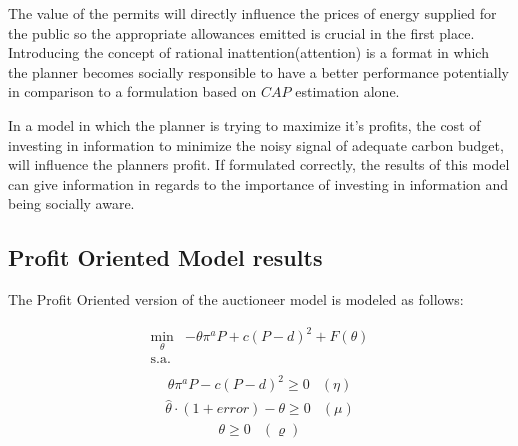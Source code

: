\documentclass[a4paper,fleqn]{cas-dc}
\begin{document}
%

The value of the permits will directly influence the prices of energy supplied for the public so the appropriate allowances emitted is crucial in the first place. Introducing the concept of rational inattention(attention) is a format in which the planner becomes socially responsible to have a better performance potentially in comparison to a formulation based on $CAP$ estimation alone.

In a model in which the planner is trying to maximize it's profits, the cost of investing in information to minimize the noisy signal of adequate carbon budget, will influence the planners profit. If formulated correctly, the results of this model can give information in regards to the importance of investing in information and being socially aware.



\subsection{Profit Oriented Model results}\label{subsec:resultsPO}
\vspace{2.5mm}
The Profit Oriented version of the auctioneer model is modeled as follows:


\begin{equation}
\begin{array}{rrclcl}
   \displaystyle \min_{\theta} & -\theta \pi^aP + c(P-d)^2+F(\theta) \\\textrm{s.a.} \label{eq:profit2}\\
\end{array}
\end{equation}
\begin{equation}
\begin{array}{cl}
    \theta \pi^a P - c(P-d)^2 \geq 0 & (\eta)  \label{profit2:r1}
\end{array}
\end{equation}
\begin{equation}
\begin{array}{cl}
    \hat{\theta}\cdot(1+error)-\theta \geq 0 & (\mu)  \label{profit2:r2}
\end{array}
\end{equation}
\begin{equation}
\begin{array}{cl}
    \theta \geq 0 & (\varrho)
\end{array}
\end{equation}
\end{document}
